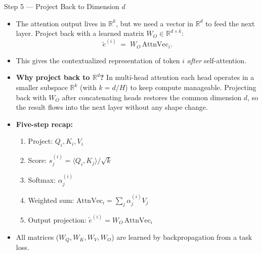 \documentclass[10pt,english,aspectratio=169]{beamer}
\begin{document}
\begin{frame}{Step 5 --- Project Back to Dimension $d$}
\begin{itemize}
\item The attention output lives in $\mathbb{R}^{k}$, but we need a vector in $\mathbb{R}^{d}$ to feed the next layer. Project back with a learned matrix $W_{O} \in \mathbb{R}^{d \times k}$:
\[
   \tilde{e}^{(i)} \;=\; W_{O}\,\text{AttnVec}_{i}.
\]

\medskip
\item This gives the contextualized representation of token $i$ \emph{after} self-attention.

\medskip
\item \textbf{Why project back to $\mathbb{R}^{d}$?} In multi-head attention each head operates in a smaller subspace $\mathbb{R}^{k}$ (with $k=d/H$) to keep compute manageable. Projecting back with $W_O$ after concatenating heads restores the common dimension $d$, so the result flows into the next layer without any shape change.

\medskip
\item \textbf{Five-step recap:}
\begin{enumerate}
    \item Project: $Q_i, K_i, V_i$
    \item Score: $s_{j}^{(i)} = \langle Q_i, K_j\rangle / \sqrt{k}$
    \item Softmax: $\alpha_{j}^{(i)}$
    \item Weighted sum: $\text{AttnVec}_i = \sum_j \alpha_{j}^{(i)} V_j$
    \item Output projection: $\tilde{e}^{(i)} = W_O\, \text{AttnVec}_i$
\end{enumerate}

\medskip
\item All matrices ($W_Q, W_K, W_V, W_O$) are learned by backpropagation from a task loss.
\end{itemize}
\end{frame}
\end{document}
